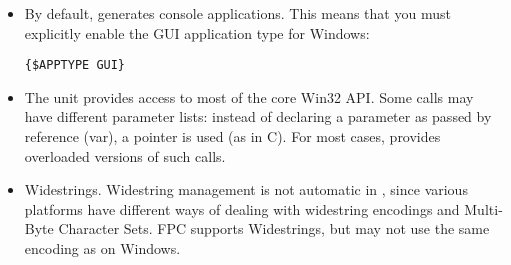 \begin{itemize}
\item By default, \fpc generates console applications. This means that
you must explicitly enable the GUI application type for Windows:
\begin{verbatim}
{$APPTYPE GUI}
\end{verbatim}
\item The  unit provides access to most of the core
Win32 API. Some calls may have different parameter lists: instead
of declaring a parameter as passed by reference (var), a pointer
is used (as in C). For most cases, \fpc provides overloaded versions
of such calls.
\item Widestrings. Widestring management is not automatic in \fpc,
since various platforms have different ways of dealing with widestring
encodings and Multi-Byte Character Sets.
FPC supports Widestrings, but may not use the same encoding as on Windows.


\end{itemize}
